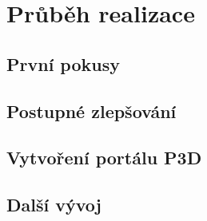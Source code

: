 \chapter{Průběh realizace}

\section*{První pokusy}

\section*{Postupné zlepšování}

\section*{Vytvoření portálu P3D}

\section*{Další vývoj}